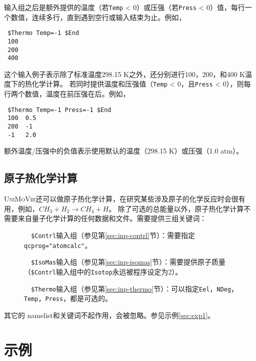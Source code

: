 \documentclass[12pt,a4paper,openany,twoside,cap,UTF8]{ctexbook}
\begin{document}
输入组之后是额外提供的温度（若\verb|Temp| < 0）或压强（若\verb|Press| < 0）值，每行一个数值，连续多行，直到遇到空行或输入结束为止。例如，
\begin{colorboxed}[oval=false,boxcolor=blue!75!black,bgcolor=blue!5!white]
\ttfamily
\begin{lstlisting}
 $Thermo Temp=-1 $End
 100
 200
 400
\end{lstlisting}\end{colorboxed}
这个输入例子表示除了标准温度298.15 K之外，还分别进行100，200，和400 K温度下的热化学计算。
若同时提供温度和压强值（\verb|Temp| < 0，且\verb|Press| < 0），则每行两个数值，温度在前压强在后。例如，
\begin{colorboxed}[oval=false,boxcolor=blue!75!black,bgcolor=blue!5!white]
\ttfamily
\begin{lstlisting}
 $Thermo Temp=-1 Press=-1 $End
 100  0.5
 200  -1
 -1   2.0
\end{lstlisting}\end{colorboxed}
额外温度/压强中的负值表示使用默认的温度（298.15 K）或压强（1.0 atm）。

\section{原子热化学计算} \label{sec:inp-atom}

\textsc{UniMoVib}还可以做原子热化学计算，在研究某些涉及原子的化学反应时会很有用，例如，$CH_3 + H_2 \rightarrow CH_4 + H$。
除了可选的总能量以外，原子热化学计算不需要来自量子化学计算的任何数据和文件。需要提供三组关键词：

\begin{description}
\item[ ]\verb|  $Contrl|输入组（参见第\ref{sec:inp-contrl}节）：需要指定\verb|qcprog="atomcalc"|。
\item[ ]\verb|  $IsoMas|输入组（参见第\ref{sec:inp-isomas}节）：需要提供原子质量（\verb|$Contrl|输入组中的\verb|Isotop|永远被程序设定为2）。
\item[ ]\verb|  $Thermo|输入组（参见第\ref{sec:inp-thermo}节）：可以指定\verb|Eel|，\verb|NDeg|，\verb|Temp|，\verb|Press|，都是可选的。
\end{description}
其它的 namelist和关键词不起作用，会被忽略。参见示例\ref{sec:exp1}。

\chapter{示例} \label{part:examp}
\end{document}
